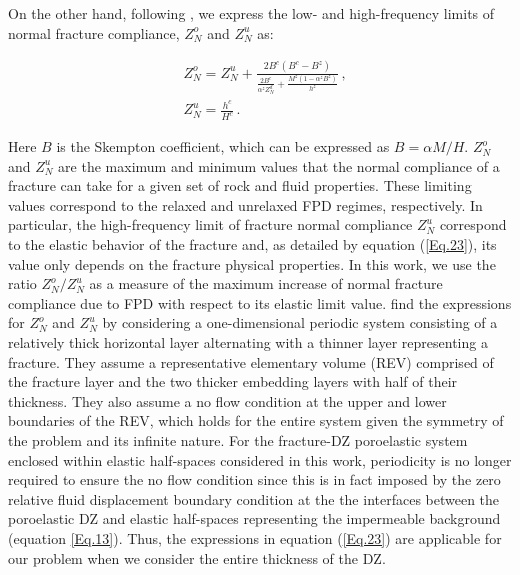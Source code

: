 \documentclass[draft]{agujournal2019}
\begin{document}
On the other hand, following , we express the low- and high-frequency limits of normal fracture compliance, $Z_N^o$ and $Z_N^u$ as:
\begin{linenomath*}
\begin{equation} \label{Eq.23}
\begin{split}
 & Z_N^o= Z_N^u + \frac{2 B^{c} \left(B^c-B^z \right)}{ \frac{2 B^c}{\alpha^z Z_N^d} + \frac{M^z(1-\alpha^z B^{z})}{h^z} }\,,\\
 & Z_N^u= \frac{h^{c}}{H^{c}}\,.
\end{split}
\end{equation}
\end{linenomath*}
Here $B$ is the Skempton coefficient, which can be expressed as $B=\alpha M/H$.  $Z_N^o$ and $Z_N^u$ are the maximum and minimum values that the normal compliance of a fracture can take for a given set of rock and fluid properties. These limiting values correspond to the relaxed and unrelaxed FPD regimes, respectively. In particular, the high-frequency limit of fracture normal compliance $Z_N^u$ correspond
to the elastic behavior of the fracture and, as detailed by equation (\ref{Eq.23}), its value only depends on the fracture physical properties. In this work, we use the ratio $Z_N^o/Z_N^u$ as a measure of the maximum increase of normal fracture compliance due to FPD with respect to its elastic limit value.
 find the expressions for $Z_N^o$ and $Z_N^u$ by considering a one-dimensional periodic system consisting of a relatively thick horizontal layer alternating with a thinner layer representing a fracture. They assume a representative elementary volume (REV) comprised of the fracture layer and the two thicker embedding layers with half of their thickness. 
They also assume a no flow condition at the  upper and lower boundaries of the REV, which holds for the entire system given the symmetry of the problem and its infinite nature. For  the fracture-DZ poroelastic system enclosed within elastic half-spaces considered in this work, periodicity is no longer required to ensure the no flow condition since this is in fact imposed by the zero relative fluid displacement boundary condition at the the interfaces between the poroelastic DZ and elastic half-spaces representing the impermeable background (equation \ref{Eq.13}). Thus, the expressions in equation (\ref{Eq.23}) are applicable for our problem when we consider the entire thickness of the DZ.
\end{document}

